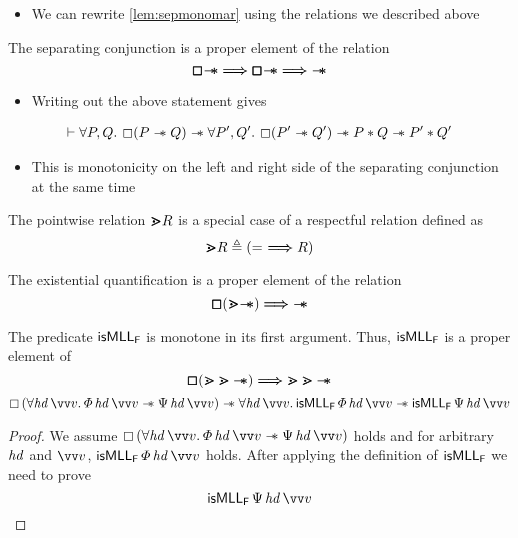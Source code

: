 \documentclass[thesis.tex]{subfiles}
\begin{document}
\begin{itemize}
    \item We can rewrite \cref*{lem:sepmonomar} using the relations we described above
\end{itemize}
\begin{lemma}
    The separating conjunction is a proper element of the relation
    $$\pmb{\mathop{\boxempty}}{{\bm{\mathrel{-\!\!\ast}}}} \bm{\Longrightarrow} \pmb{\mathop{\boxempty}}{{\bm{\mathrel{-\!\!\ast}}}} \bm{\Longrightarrow} {{\bm{\mathrel{-\!\!\ast}}}}$$
\end{lemma}
\begin{itemize}
    \item Writing out the above statement gives
\end{itemize}
\begin{align*}
    \proves \All \prop,\propB. \always(\prop \wand \propB) \wand \All \prop',\propB'. \always(\prop' \wand \propB') \wand \prop * \propB \wand \prop' * \propB'
\end{align*}
\begin{itemize}
    \item This is monotonicity on the left and right side of the separating conjunction at the same time
\end{itemize}

\begin{definition}
    The pointwise relation $\bm{\gtrdot} R$ is a special case of a respectful relation defined as
    \[\bm{\gtrdot} R \triangleq (=\ \bm{\Longrightarrow} R)\]
\end{definition}

\begin{lemma}
    The existential quantification is a proper element of the relation \[\pmb{\mathop{\boxempty}}(\bm{\gtrdot}{\bm{\mathrel{-\!\!\ast}}}) \bm{\Longrightarrow} {{\bm{\mathrel{-\!\!\ast}}}}\]
\end{lemma}

\begin{example}
    The predicate $\textsf{\upshape isMLL}_{\textsf{\upshape F}}$ is monotone in its first argument. Thus, $\textsf{\upshape isMLL}_{\textsf{\upshape F}}$ is a proper element of
    \[
        \pmb{\mathop{\boxempty}} (\bm{\gtrdot} \bm{\gtrdot} {\bm{\mathrel{-\!\!\ast}}}) \bm{\Longrightarrow} \bm{\gtrdot} \bm{\gtrdot} {\bm{\mathrel{-\!\!\ast}}}
    \]
    \[
        \always{(\All \hd\, \vect{v}. \pred\, \hd\, \vect{v} \wand \predB\, \hd\, \vect{v})} \wand \All \hd\, \vect{v}. \isMLL_\hopred\, \pred\, \hd\, \vect{v} \wand \isMLL_\hopred\, \predB\, \hd\, \vect{v}
    \]
\end{example}
\begin{proof}
    We assume $\always{(\All \hd\, \vect{v}. \pred\, \hd\, \vect{v} \wand \predB\, \hd\, \vect{v})}$ holds and for arbitrary $\mathit{hd}$ and $\vect{v}$, $\isMLL_\hopred\, \pred\, \hd\, \vect{v}$ holds.
    After applying the definition of $\textsf{\upshape isMLL}_{\textsf{\upshape F}}$ we need to prove \[\isMLL_\hopred\, \predB\, \hd\, \vect{v}\]
\end{proof}
\end{document}
